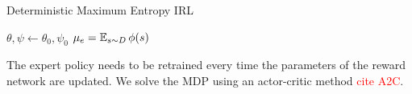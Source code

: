 \begin{algorithm}[tbhp]
	\caption{Deterministic Maximum Entropy IRL}
	\label{deterministic-medirl}
	
	
	
	\BlankLine
	$\theta, \psi \gets \theta_0, \psi_0$ \DontPrintSemicolon {} 
	$\mu_e= \operatorname*{\mathbb{E}}_{s \sim D}{\phi(s)}$ \DontPrintSemicolon {}
	\BlankLine
	
\end{algorithm}

The expert policy needs to be retrained every time the parameters of the reward network are updated. We solve the MDP using an actor-critic method \textcolor{red}{cite A2C}.



